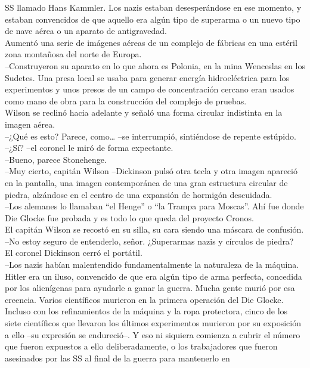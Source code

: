 SS llamado Hans Kammler. Los nazis estaban desesperándose en ese
momento, y estaban convencidos de que aquello era algún tipo de
superarma o un nuevo tipo de nave aérea o un aparato de antigravedad.\\
Aumentó una serie de imágenes aéreas de un complejo de fábricas en una
estéril zona montañosa del norte de Europa.\\
--Construyeron su aparato en lo que ahora es Polonia, en la mina
Wenceslas en los Sudetes. Una presa local se usaba para generar energía
hidroeléctrica para los experimentos y unos presos de un campo de
concentración cercano eran usados como mano de obra para la construcción
del complejo de pruebas.\\
Wilson se reclinó hacia adelante y señaló una forma circular indistinta
en la imagen aérea.\\
--¿Qué es esto? Parece, como\ldots{} --se interrumpió, sintiéndose de
repente estúpido.\\
--¿Sí? --el coronel le miró de forma expectante.\\
--Bueno, parece Stonehenge.\\
--Muy cierto, capitán Wilson --Dickinson pulsó otra tecla y otra imagen
apareció en la pantalla, una imagen contemporánea de una gran estructura
circular de piedra, alzándose en el centro de una expansión de hormigón
descuidada.\\
--Los alemanes lo llamaban ``el Henge'' o ``la Trampa para Moscas''. Ahí
fue donde Die Glocke fue probada y es todo lo que queda del proyecto
Cronos.\\
El capitán Wilson se recostó en su silla, su cara siendo una máscara de
confusión.\\
--No estoy seguro de entenderlo, señor. ¿Superarmas nazis y círculos de
piedra?\\
El coronel Dickinson cerró el portátil.\\
--Los nazis habían malentendido fundamentalmente la naturaleza de la
máquina. Hitler era un iluso, convencido de que era algún tipo de arma
perfecta, concedida por los alienígenas para ayudarle a ganar la guerra.
Mucha gente murió por esa creencia. Varios científicos murieron en la
primera operación del Die Glocke. Incluso con los refinamientos de la
máquina y la ropa protectora, cinco de los siete científicos que
llevaron los últimos experimentos murieron por su exposición a ello --su
expresión se endureció--. Y eso ni siquiera comienza a cubrir el número
que fueron expuestos a ello deliberadamente, o los trabajadores que
fueron asesinados por las SS al final de la guerra para mantenerlo en
